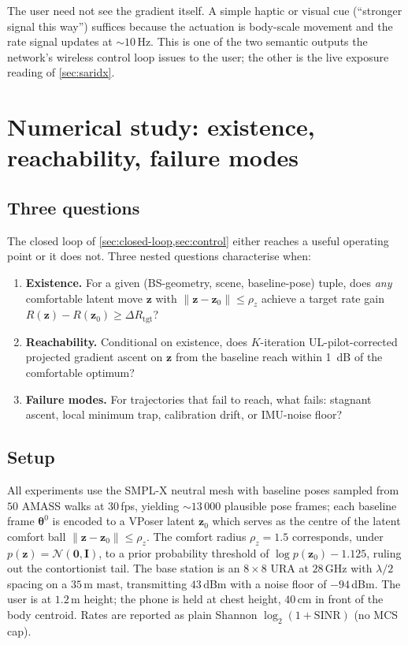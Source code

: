 \documentclass[journal,twocolumn,10pt]{IEEEtran}
\theoremstyle{plain}
\theoremstyle{definition}
\theoremstyle{remark}
\newcommand{\thetab}{\bm{\theta}}
\begin{document}
The user need not see the gradient itself. A simple haptic or
visual cue (``stronger signal this way'') suffices because the
actuation is body-scale movement and the rate signal updates at
$\sim 10\,$Hz. This is one of the two semantic outputs the
network's wireless control loop issues to the user; the other is
the live exposure reading of \cref{sec:saridx}.


\section{Numerical study: existence, reachability, failure modes}\label{sec:numerical}

\subsection{Three questions}

The closed loop of \cref{sec:closed-loop,sec:control} either reaches
a useful operating point or it does not. Three nested questions
characterise when:
\begin{enumerate}
\item[\textbf{(E)}] \textbf{Existence.} For a given (BS-geometry,
scene, baseline-pose) tuple, does \emph{any} comfortable latent
move $\bm{z}$ with $\|\bm{z} - \bm{z}_0\| \leq \rho_z$ achieve a
target rate gain $R(\bm{z}) - R(\bm{z}_0) \geq \Delta R_{\mathrm{tgt}}$?
\item[\textbf{(R)}] \textbf{Reachability.} Conditional on existence,
does $K$-iteration UL-pilot-corrected projected gradient ascent
on $\bm{z}$ from the baseline reach within 1~dB of the comfortable
optimum?
\item[\textbf{(F)}] \textbf{Failure modes.} For trajectories that
fail to reach, what fails: stagnant ascent, local minimum trap,
calibration drift, or IMU-noise floor?
\end{enumerate}

\subsection{Setup}

All experiments use the SMPL-X neutral mesh with baseline poses
sampled from $50$ AMASS walks at $30\,$fps, yielding $\sim\!13\,000$
plausible pose frames; each baseline frame $\thetab^{0}$ is encoded
to a VPoser latent $\bm{z}_0$ which serves as the centre of the
latent comfort ball $\|\bm{z} - \bm{z}_0\| \leq \rho_z$. The
comfort radius $\rho_z = 1.5$ corresponds, under
$p(\bm{z}) = \mathcal{N}(\bm{0}, \bm{I})$, to a prior probability
threshold of $\log p(\bm{z}_0) - 1.125$, ruling out the
contortionist tail. The base station is an $8\times 8$ URA at
$28\,$GHz with $\lambda/2$ spacing on a $35\,$m mast, transmitting
$43\,$dBm with a noise floor of $-94\,$dBm. The user is at $1.2\,$m
height; the phone is held at chest height, $40\,$cm in front of the
body centroid. Rates are reported as plain Shannon
$\log_2(1 + \mathrm{SINR})$ (no MCS cap).
\end{document}
